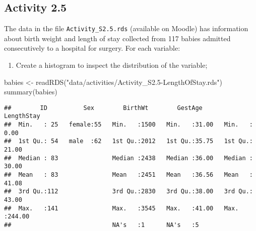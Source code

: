 \documentclass[
]{memoir}
\newenvironment{Shaded}{\begin{snugshade}}{\end{snugshade}}
\newcommand{\AttributeTok}[1]{\textcolor[rgb]{0.77,0.63,0.00}{#1}}
\newcommand{\FunctionTok}[1]{\textcolor[rgb]{0.00,0.00,0.00}{#1}}
\newcommand{\NormalTok}[1]{#1}
\newcommand{\OtherTok}[1]{\textcolor[rgb]{0.56,0.35,0.01}{#1}}
\newcommand{\SpecialCharTok}[1]{\textcolor[rgb]{0.00,0.00,0.00}{#1}}
\newcommand{\StringTok}[1]{\textcolor[rgb]{0.31,0.60,0.02}{#1}}
\providecommand{\tightlist}{%
  \setlength{\itemsep}{0pt}\setlength{\parskip}{0pt}}
\begin{document}
\hypertarget{activity-2.5}{%
\subsection*{Activity 2.5}\label{activity-2.5}}

The data in the file \texttt{Activity\_S2.5.rds} (available on Moodle) has information about birth weight and length of stay collected from 117 babies admitted consecutively to a hospital for surgery. For each variable:

\begin{enumerate}
\def\labelenumi{\alph{enumi}.}
\tightlist
\item
  Create a histogram to inspect the distribution of the variable;
\end{enumerate}

\begin{Shaded}
\begin{Highlighting}[]
\NormalTok{babies }\OtherTok{\textless{}{-}} \FunctionTok{readRDS}\NormalTok{(}\StringTok{"data/activities/Activity\_S2.5{-}LengthOfStay.rds"}\NormalTok{)}
\FunctionTok{summary}\NormalTok{(babies)}
\end{Highlighting}
\end{Shaded}

\begin{verbatim}
##        ID          Sex        BirthWt        GestAge        LengthStay    
##  Min.   : 25   female:55   Min.   :1500   Min.   :31.00   Min.   :  0.00  
##  1st Qu.: 54   male  :62   1st Qu.:2012   1st Qu.:35.75   1st Qu.: 21.00  
##  Median : 83               Median :2438   Median :36.00   Median : 30.00  
##  Mean   : 83               Mean   :2451   Mean   :36.56   Mean   : 41.08  
##  3rd Qu.:112               3rd Qu.:2830   3rd Qu.:38.00   3rd Qu.: 43.00  
##  Max.   :141               Max.   :3545   Max.   :41.00   Max.   :244.00  
##                            NA's   :1      NA's   :5
\end{verbatim}

\begin{Shaded}
\end{Shaded}
\end{document}
